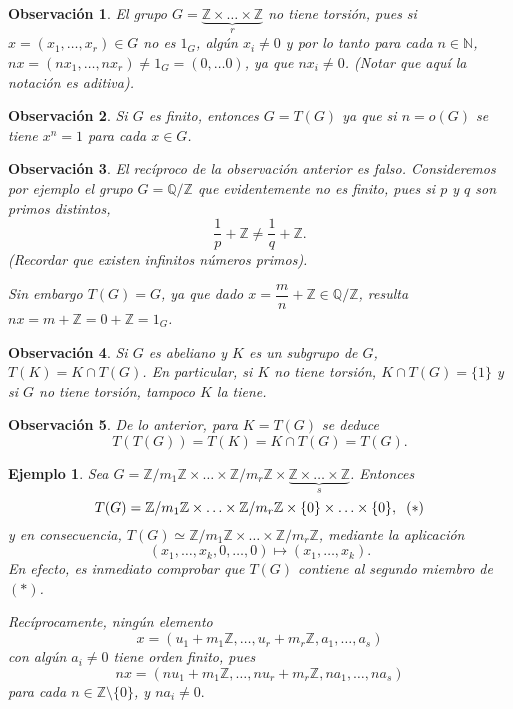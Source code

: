 \documentclass[12pt]{article}
\newtheorem{example}{Ejemplo}[theorem]
\newtheorem{observation}{Observación}[theorem]
\begin{document}
\begin{observation} El grupo $G = \underbrace{\mathbb{Z} \times \ldots \times \mathbb{Z}}_r$ no tiene torsión, pues si $x= (x_1, \ldots, x_r) \in G$ no es $1_G$, algún $x_i \neq 0$ y por lo tanto para cada $n \in \mathbb{N}$, $nx = (nx_1, \ldots, nx_r) \neq 1_G = (0, \ldots 0)$, ya que $nx_i \neq 0$. (Notar que aquí la notación es aditiva).
\end{observation}

\begin{observation}Si $G$ es finito, entonces $G = T(G)$ ya que si $n = o(G)$ se tiene $x^n = 1$ para cada $x \in G$.
\end{observation}

\begin{observation}El recíproco de la observación anterior es falso. Consideremos por ejemplo el grupo $G = \mathbb{Q}/\mathbb{Z}$ que evidentemente no es finito, pues si $p$ y $q$ son primos distintos, $$\dfrac{1}{p} + \mathbb{Z} \neq \dfrac{1}{q} + \mathbb{Z}.$$ (Recordar que existen infinitos números primos). 

Sin embargo $T(G) = G$, ya que dado $x = \dfrac{m}{n} + \mathbb{Z} \in \mathbb{Q}/\mathbb{Z}$, resulta $nx = m+ \mathbb{Z} = 0 + \mathbb{Z} = 1_G$.
\end{observation}

\begin{observation}Si $G$ es abeliano y $K$ es un subgrupo de $G$, $T(K) = K \cap T(G)$. En particular, si $K$ no tiene torsión, $K \cap T(G) = \lbrace 1 \rbrace$ y si $G$ no tiene torsión, tampoco $K$ la tiene.
\end{observation}

\begin{observation}De lo anterior, para $K = T(G)$ se deduce $$T(T(G)) = T(K) = K \cap T(G) = T(G).$$
\end{observation}

\begin{example}Sea $G = \mathbb{Z}/m_1\mathbb{Z} \times \ldots \times \mathbb{Z}/m_r\mathbb{Z} \times \underbrace{\mathbb{Z} \times \ldots \times \mathbb{Z}}_s$. Entonces $$T(G) = \mathbb{Z}/m_1 \mathbb{Z} \times \ldots \times \mathbb{Z}/m_r\mathbb{Z} \times \lbrace 0 \rbrace \times \ldots \times \lbrace 0 \rbrace, \hspace{0.2cm} (\ast)$$ y en consecuencia, $T(G) \simeq \mathbb{Z}/m_1\mathbb{Z} \times \ldots \times \mathbb{Z}/m_r\mathbb{Z}$, mediante la aplicación $$(x_1, \ldots, x_k, 0, \ldots, 0) \longmapsto (x_1, \ldots, x_k).$$ En efecto, es inmediato comprobar que $T(G)$ contiene al segundo miembro de $(\ast)$. 

Recíprocamente, ningún elemento $$x=(u_1 + m_1 \mathbb{Z}, \ldots, u_r + m_r\mathbb{Z}, a_1, \ldots, a_s)$$ con algún $a_i \neq 0$ tiene orden finito, pues $$nx=(nu_1 + m_1 \mathbb{Z}, \ldots, nu_r + m_r\mathbb{Z}, na_1, \ldots, na_s)$$ para cada $n \in \mathbb{Z}\setminus \lbrace 0 \rbrace$, y $na_i \neq 0.$
\end{example}
\end{document}
